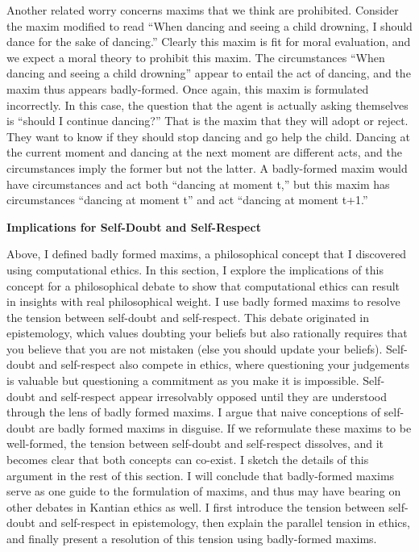 \begin{isabellebody}
\begin{isamarkuptext}
Another related worry concerns maxims that we think are prohibited. Consider the maxim modified to 
read ``When dancing and seeing a child drowning, I should dance for the sake of dancing.'' Clearly this 
maxim is fit for moral evaluation, and we expect a moral theory to prohibit this maxim. The circumstances 
``When dancing and seeing a child drowning'' appear to entail the act of dancing, and the maxim thus 
appears badly-formed. Once again, this maxim is formulated incorrectly. In this case, the question 
that the agent is actually asking themselves is ``should I continue dancing?'' That is the 
maxim that they will adopt or reject. They want to know if they should stop dancing and go help the child. 
Dancing at the current moment and dancing at the next moment are different acts, and the circumstances 
imply the former but not the latter. A badly-formed maxim would have circumstances and act both 
``dancing at moment t,'' but this maxim has circumstances ``dancing at moment t'' and act ``dancing 
at moment t+1.''

\noindent \textbf{Implications for Self-Doubt and Self-Respect}

Above, I defined badly formed maxims, a philosophical concept that I discovered
using computational ethics. In this section, I explore the implications of this concept for a 
philosophical debate to show that computational ethics can result in insights with real 
philosophical weight. I use badly formed maxims to resolve the tension between self-doubt and self-respect. 
This debate originated in epistemology, which values doubting your beliefs but also rationally requires
that you believe that you are not mistaken (else you should update your beliefs). 
Self-doubt and self-respect also compete in ethics, where questioning your judgements is valuable but 
questioning a commitment as you make it is impossible. Self-doubt and self-respect appear 
irresolvably opposed until they are understood through the lens of badly formed maxims. I argue that naive
conceptions of self-doubt are badly formed maxims in disguise. If we reformulate these maxims to be well-formed,
the tension between self-doubt and self-respect dissolves, and it becomes clear that both concepts can
co-exist. I sketch the details of this argument in the rest of this section. I will conclude that 
badly-formed maxims serve as one guide to the formulation of maxims, and thus may have bearing on 
other debates in Kantian ethics as well. I first introduce the tension between self-doubt and self-respect 
in epistemology, then explain the parallel tension in ethics, and finally present a resolution of this 
tension using badly-formed maxims.


\end{isamarkuptext}
\end{isabellebody}

